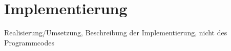 \section{Implementierung}

Realisierung/Umsetzung, Beschreibung der Implementierung, nicht des Programmcodes

\pagebreak